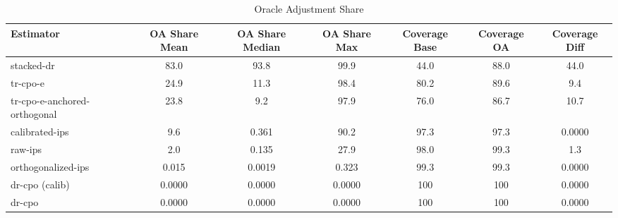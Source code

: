 \begin{table}[htbp]
\centering
\caption{Oracle Adjustment Share}
\label{tab:A4}
\begin{tabular}{l|cccccc}
\toprule
Estimator & OA Share Mean & OA Share Median & OA Share Max & Coverage Base & Coverage OA & Coverage Diff \\
\midrule
stacked-dr & 83.0 & 93.8 & 99.9 & 44.0 & 88.0 & 44.0 \\
tr-cpo-e & 24.9 & 11.3 & 98.4 & 80.2 & 89.6 & 9.4 \\
tr-cpo-e-anchored-orthogonal & 23.8 & 9.2 & 97.9 & 76.0 & 86.7 & 10.7 \\
calibrated-ips & 9.6 & 0.361 & 90.2 & 97.3 & 97.3 & 0.0000 \\
raw-ips & 2.0 & 0.135 & 27.9 & 98.0 & 99.3 & 1.3 \\
orthogonalized-ips & 0.015 & 0.0019 & 0.323 & 99.3 & 99.3 & 0.0000 \\
dr-cpo (calib) & 0.0000 & 0.0000 & 0.0000 & 100 & 100 & 0.0000 \\
dr-cpo & 0.0000 & 0.0000 & 0.0000 & 100 & 100 & 0.0000 \\
\bottomrule
\end{tabular}
\end{table}